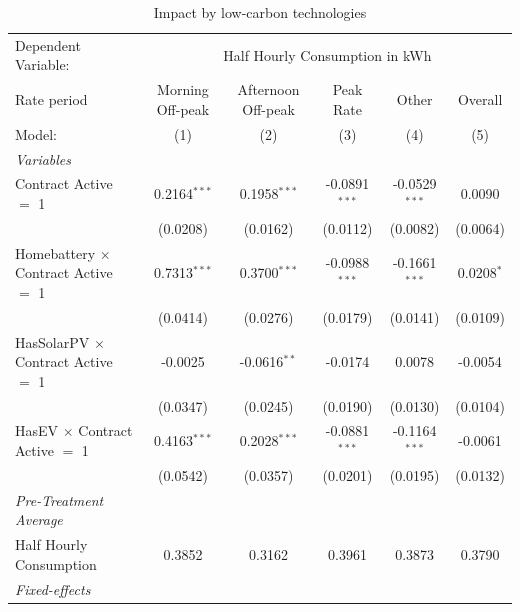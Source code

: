 
\begin{table}[htbp]
   \caption{\label{tab:did-lcts} Impact by low-carbon technologies}
   \centering
   \begin{tabular}{lccccc}
      \tabularnewline \midrule \midrule
      Dependent Variable: & \multicolumn{5}{c}{Half Hourly Consumption in kWh}\\
      Rate period                                 & Morning Off-peak & Afternoon Off-peak & Peak Rate       & Other           & Overall \\   
      Model:                                      & (1)              & (2)                & (3)             & (4)             & (5)\\  
      \midrule
      \emph{Variables}\\
      Contract Active $=$ 1                       & 0.2164$^{***}$   & 0.1958$^{***}$     & -0.0891$^{***}$ & -0.0529$^{***}$ & 0.0090\\   
                                                  & (0.0208)         & (0.0162)           & (0.0112)        & (0.0082)        & (0.0064)\\   
      Homebattery $\times$ Contract Active $=$ 1  & 0.7313$^{***}$   & 0.3700$^{***}$     & -0.0988$^{***}$ & -0.1661$^{***}$ & 0.0208$^{*}$\\   
                                                  & (0.0414)         & (0.0276)           & (0.0179)        & (0.0141)        & (0.0109)\\   
      HasSolarPV $\times$ Contract Active $=$ 1   & -0.0025          & -0.0616$^{**}$     & -0.0174         & 0.0078          & -0.0054\\   
                                                  & (0.0347)         & (0.0245)           & (0.0190)        & (0.0130)        & (0.0104)\\   
      HasEV $\times$ Contract Active $=$ 1        & 0.4163$^{***}$   & 0.2028$^{***}$     & -0.0881$^{***}$ & -0.1164$^{***}$ & -0.0061\\   
                                                  & (0.0542)         & (0.0357)           & (0.0201)        & (0.0195)        & (0.0132)\\   
\midrule
\emph{Pre-Treatment Average}\\
      Half Hourly Consumption                     & 0.3852           & 0.3162             & 0.3961          & 0.3873          & 0.3790\\  
      \midrule
      \emph{Fixed-effects}\\

\end{tabular}
\end{table}
